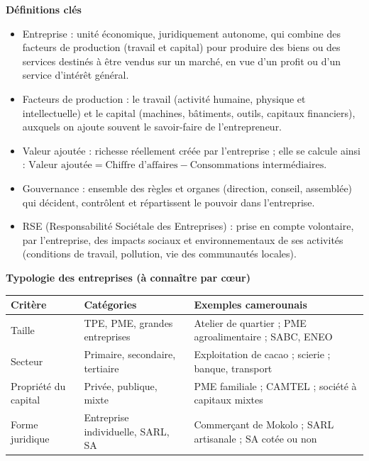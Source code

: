\documentclass[11pt]{article}
\newcommand{\cle}[1]{{\popxbold\color{popdark}#1}}
\begin{document}
\begin{bilan}
\textbf{Définitions clés}
\begin{itemize}
\item \cle{Entreprise} : unité économique, juridiquement autonome, qui combine des facteurs de production (travail et capital) pour produire des biens ou des services destinés à être vendus sur un marché, en vue d'un profit ou d'un service d'intérêt général.
\item \cle{Facteurs de production} : le \cle{travail} (activité humaine, physique et intellectuelle) et le \cle{capital} (machines, bâtiments, outils, capitaux financiers), auxquels on ajoute souvent le savoir-faire de l'entrepreneur.
\item \cle{Valeur ajoutée} : richesse réellement créée par l'entreprise ; elle se calcule ainsi : $\text{Valeur ajoutée} = \text{Chiffre d'affaires} - \text{Consommations intermédiaires}$.
\item \cle{Gouvernance} : ensemble des règles et organes (direction, conseil, assemblée) qui décident, contrôlent et répartissent le pouvoir dans l'entreprise.
\item \cle{RSE} (Responsabilité Sociétale des Entreprises) : prise en compte volontaire, par l'entreprise, des impacts sociaux et environnementaux de ses activités (conditions de travail, pollution, vie des communautés locales).
\end{itemize}

\textbf{Typologie des entreprises (à connaître par c\oe ur)}
\begin{center}
\begin{tabularx}{\linewidth}{|l|X|X|}
\hline
\rowcolor{popblueL} \textbf{Critère} & \textbf{Catégories} & \textbf{Exemples camerounais} \\
\hline
Taille & TPE, PME, grandes entreprises & Atelier de quartier ; PME agroalimentaire ; SABC, ENEO \\
\hline
Secteur & Primaire, secondaire, tertiaire & Exploitation de cacao ; scierie ; banque, transport \\
\hline
Propriété du capital & Privée, publique, mixte & PME familiale ; CAMTEL ; société à capitaux mixtes \\
\hline
Forme juridique & Entreprise individuelle, SARL, SA & Commerçant de Mokolo ; SARL artisanale ; SA cotée ou non \\
\hline
\end{tabularx}
\end{center}


\end{bilan}
\end{document}
